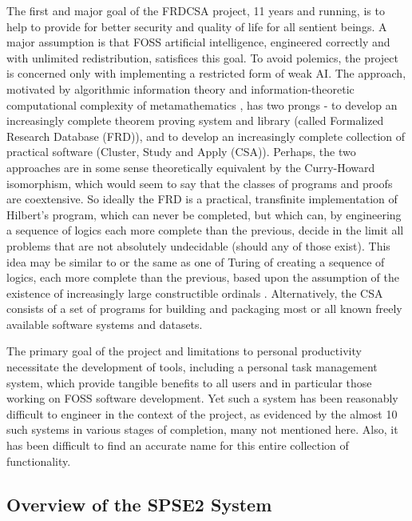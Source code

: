 \documentclass[letterpaper]{article}
\begin{document}
\noindent The first and major goal of the FRDCSA project, 11 years and
running, is to help to provide for better security and quality of life
for all sentient beings.  A major assumption is that FOSS artificial
intelligence, engineered correctly and with unlimited redistribution,
satisfices this goal.  To avoid polemics, the project is concerned
only with implementing a restricted form of weak AI.  The approach,
motivated by algorithmic information theory and information-theoretic
computational complexity of metamathematics
\cite{Chaitin74information-theoreticlimitations}, has two prongs - to
develop an increasingly complete theorem proving system and library
(called Formalized Research Database (FRD)), and to develop an
increasingly complete collection of practical software (Cluster, Study
and Apply (CSA)).  Perhaps, the two approaches are in some sense
theoretically equivalent by the Curry-Howard isomorphism, which would
seem to say that the classes of programs and proofs are coextensive.
So ideally the FRD is a practical, transfinite implementation of
Hilbert's program, which can never be completed, but which can, by
engineering a sequence of logics each more complete than the previous,
decide in the limit all problems that are not absolutely undecidable
(should any of those exist).  This idea may be similar to or the same
as one of Turing of creating a sequence of logics, each more complete
than the previous, based upon the assumption of the existence of
increasingly large constructible ordinals \cite{turing1939}.
Alternatively, the CSA consists of a set of programs for building and
packaging most or all known freely available software systems and
datasets.

The primary goal of the project and limitations to personal
productivity necessitate the development of tools, including a
personal task management system, which provide tangible benefits to
all users and in particular those working on FOSS software
development.  Yet such a system has been reasonably difficult to
engineer in the context of the project, as evidenced by the almost 10
such systems in various stages of completion, many not mentioned here.
Also, it has been difficult to find an accurate name for this entire
collection of functionality.

\subsection{Overview of the SPSE2 System}
\end{document}
